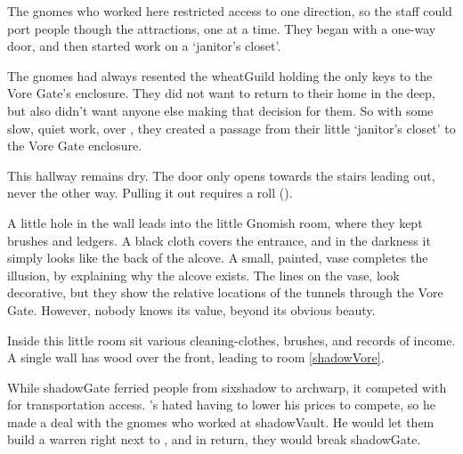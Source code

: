 \begin{multicols}{2}

\begin{exampletext}
  The gnomes who worked here restricted access to one direction, so the staff could port people though the attractions, one at a time.
  They began with a one-way door, and then started work on a `janitor's closet'.

  The gnomes had always resented the \gls{wheatGuild} holding the only keys to the Vore Gate's enclosure.
  They did not want to return to their home in the \gls{deep}, but also didn't want anyone else making that decision for them.
  So with some slow, quiet work, over , they created a passage from their little `janitor's closet' to the Vore Gate enclosure.
\end{exampletext}

This hallway remains dry.
The door only opens towards the stairs leading out, never the other way.
Pulling it out requires a  roll (\tn[11]).

A little hole in the wall leads into the little Gnomish room, where they kept brushes and ledgers.
A black cloth covers the entrance, and in the darkness it simply looks like the back of the alcove.
A small, painted, vase completes the illusion, by explaining why the alcove exists.
The lines on the vase, look decorative, but they show the relative locations of the tunnels through the Vore Gate.
However, nobody knows its value, beyond its obvious beauty.


Inside this little room sit various cleaning-clothes, brushes, and records of income.
A single wall has wood over the front, leading to room \vref{shadowVore}.



\begin{exampletext}
  While \gls{shadowGate} ferried people from \gls{sixshadow} to \gls{archwarp}, it competed with  for transportation access.
  's  hated having to lower his prices to compete, so he made a deal with the gnomes who worked at \gls{shadowVault}.
  He would let them build a warren right next to , and in return, they would break \gls{shadowGate}.


\end{exampletext}
\end{multicols}

